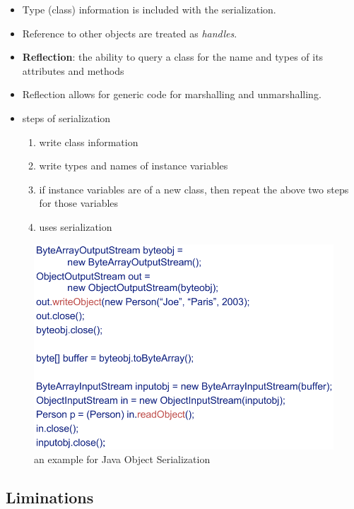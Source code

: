 \documentclass[twocolumn,landscape,10pt]{article}
\theoremstyle{definition}
\begin{document}
\begin{itemize}
    \item Type (class) information is included with the serialization.
    \item Reference to other objects are treated as \emph{handles}.
    \item \textbf{Reflection}: the ability to query a class for the name and
        types of its attributes and methods
    \item Reflection allows for generic code for marshalling and unmarshalling.
    \item steps of serialization
        \begin{enumerate}
            \item write class information
            \item write types and names of instance variables
            \item if instance variables are of a new class, then repeat the
                above two steps for those variables
            \item uses serialization
        \end{enumerate} 
\end{itemize} 

\begin{figure}[h]
  	\includegraphics[scale=0.3]{java_serialization.png}
  	\centering
    \caption{an example for Java Object Serialization}
\end{figure}

\subsection{Liminations}
\end{document}
